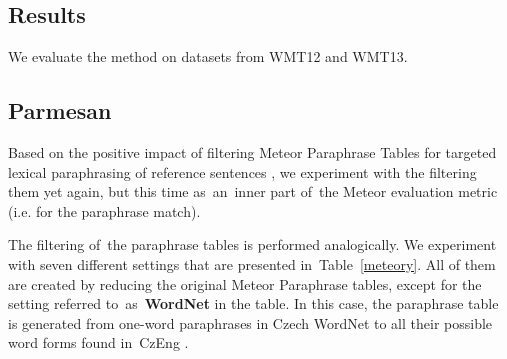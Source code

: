 \documentclass[11pt]{article}
\def\Tref#1{Table~\ref{#1}}
\begin{document}
\subsection{Results}
We evaluate the method on datasets from WMT12 and WMT13.


\subsection{Parmesan}
Based on the positive impact of filtering Meteor Paraphrase Tables for targeted lexical 
paraphrasing of reference sentences %
, we experiment with the filtering them yet again, but this time as~an~inner part of~the 
Meteor evaluation metric (i.e. for the paraphrase match).

\begin{table}[htb]
\begin{center}

\caption{Different paraphrase tables for Meteor and their size (number of paraphrase pairs).}
\label{meteory}
\end{center}
\end{table}

The filtering of~the paraphrase tables is performed analogically. We experiment with seven 
different settings that are presented in~\Tref{meteory}. All of them are created by reducing 
the original Meteor Paraphrase tables, except for the setting referred to~as~\textbf{WordNet} 
in the table. In this case, the paraphrase table is generated from one-word paraphrases in 
Czech WordNet to all their possible word forms found in~CzEng \cite{czeng}.
\end{document}
